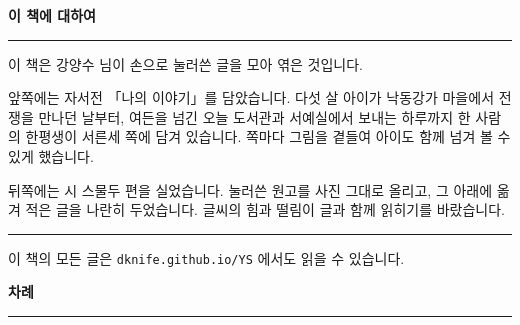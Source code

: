 \documentclass[11pt, twoside, openright]{book}
\begin{document}
\pagestyle{ysplain}

\thispagestyle{ysplain}
\begingroup
  \vspace*{16mm}
  {\sffamily\bfseries\fontsize{20}{26}\selectfont\color{ysink} 이 책에 대하여\par}
  \vspace{3mm}
  {\color{ysorange}\rule{20mm}{1.4pt}\par}
  \vspace{9mm}

  \fontsize{12.5}{22}\selectfont\RaggedRight
  이 책은 강양수 님이 손으로 눌러쓴 글을 모아 엮은 것입니다.

  앞쪽에는 자서전 「나의 이야기」를 담았습니다. 다섯 살 아이가 낙동강가 마을에서
  전쟁을 만나던 날부터, 여든을 넘긴 오늘 도서관과 서예실에서 보내는 하루까지
  한 사람의 한평생이 서른세 쪽에 담겨 있습니다. 쪽마다 그림을 곁들여
  아이도 함께 넘겨 볼 수 있게 했습니다.

  뒤쪽에는 시 스물두 편을 실었습니다. 눌러쓴 원고를 사진 그대로 올리고,
  그 아래에 옮겨 적은 글을 나란히 두었습니다. 글씨의 힘과 떨림이 글과 함께
  읽히기를 바랐습니다.

  \vspace{7mm}
  {\color{yssoft}\rule{\linewidth}{0.4pt}\par}
  \vspace{5mm}
  {\fontsize{11}{18}\selectfont\color{yssoft}
   이 책의 모든 글은 \texttt{dknife.github.io/YS} 에서도 읽을 수 있습니다.\par}
\endgroup
\clearpage

\thispagestyle{ysplain}
\begingroup
  \vspace*{12mm}
  {\sffamily\bfseries\fontsize{20}{26}\selectfont\color{ysink} 차례\par}
  \vspace{3mm}
  {\color{ysorange}\rule{20mm}{1.4pt}\par}
  \vspace{7mm}
  \setcounter{tocdepth}{2}
  \begingroup
    \setlength{\parskip}{0pt}
    \small
    \makeatletter{}\makeatother
  \endgroup
\endgroup
\clearpage
\end{document}
